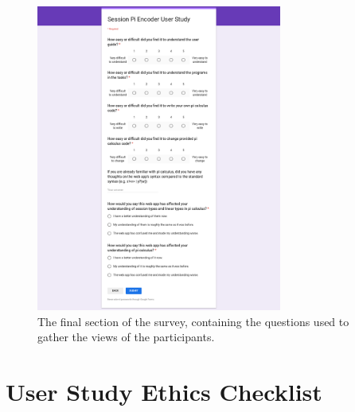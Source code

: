 \documentclass{l4proj}
\begin{document}
\begin{appendices}
\begin{figure}[H]
\centering
\includegraphics[width=0.72\textwidth]{images/SurveyPart3.png}
\caption{The final section of the survey, containing the questions used to gather the views of the participants.}
\label{fig:surveyPart2}
\end{figure}

\section{User Study Ethics Checklist}
\label{appEthics}


\end{appendices}
\end{document}
